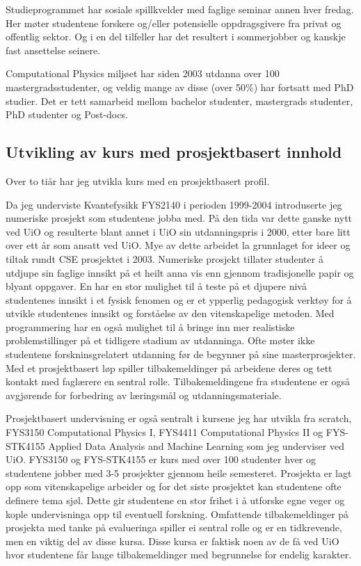 \documentclass[aps,floatfix,preprint]{revtex4-1}
\begin{document}
Studieprogrammet har sosiale spillkvelder med faglige seminar annen
hver fredag. Her møter studentene  forskere og/eller potensielle
oppdragsgivere fra privat og offentlig sektor. Og i en del tilfeller
har det resultert i sommerjobber og kanskje fast ansettelse seinere.

Computational Physics miljøet har siden 2003 utdanna over 100 mastergradsstudenter, og veldig mange av disse (over 50\%) har fortsatt med PhD studier. Det er tett samarbeid mellom bachelor studenter, mastergrads studenter, PhD studenter og Post-docs.  


\subsection*{Utvikling av kurs med prosjektbasert innhold}

Over to tiår har jeg utvikla kurs med en prosjektbasert profil.

Da jeg underviste Kvantefysikk FYS2140 i perioden 1999-2004
introduserte jeg numeriske prosjekt som studentene jobba med. På den
tida var dette ganske nytt ved UiO og resulterte blant annet i UiO
sin utdanningspris i 2000, etter bare litt over ett år som ansatt ved
UiO. Mye av dette arbeidet la grunnlaget for ideer og tiltak rundt CSE
prosjektet i 2003. Numeriske prosjekt tillater studenter å utdjupe sin
faglige innsikt på et heilt anna vis enn gjennom tradisjonelle papir
og blyant oppgaver. En har en stor mulighet til å teste på et djupere
nivå studentenes innsikt i et fysisk fenomen og er et ypperlig
pedagogisk verktøy for å utvikle studentenes innsikt og forståelse av
den vitenskapelige metoden.  Med programmering har en også mulighet
til å bringe inn mer realistiske problemstillinger på et tidligere
stadium av utdanninga. Ofte møter ikke studentene forskninsgrelatert
utdanning før de begynner på sine masterprosjekter. Med et
prosjektbasert løp spiller tilbakemeldinger på arbeidene deres og tett
kontakt med faglærere en sentral rolle. Tilbakemeldingene fra
studentene er også avgjørende for forbedring av læringsmål og
utdanningsmateriale.


Prosjektbasert undervisning er også sentralt i kursene jeg har utvikla fra scratch, FYS3150
Computational Physics I, FYS4411 Computational Physics II og
FYS-STK4155 Applied Data Analysis and Machine Learning som jeg
underviser ved UiO. FYS3150 og FYS-STK4155 er kurs med over 100
studenter hver og studentene jobber med 3-5 prosjekter gjennom heile
semesteret. Prosjekta er lagt opp som vitenskapelige arbeider og for
det siste prosjektet kan studentene ofte definere tema sjøl. Dette gir
studentene en stor frihet i å utforske egne veger og kople
undervisninga opp til eventuell forskning.  Omfattende
tilbakemeldinger på prosjekta med tanke på evalueringa spiller ei
sentral rolle og er en tidkrevende, men en viktig del av disse
kursa. Disse kursa er faktisk noen av de få ved UiO hvor
studentene får lange tilbakemeldinger med begrunnelse for endelig
karakter.
\end{document}
